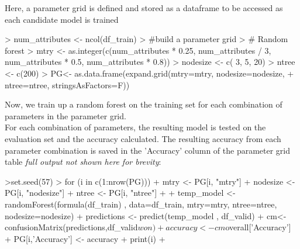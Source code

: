 \documentclass[10pt]{article}
\begin{document}
Here, a parameter grid is defined and stored as a dataframe to be accessed as each candidate model is trained
\begin{Schunk}
\begin{Sinput}
> num_attributes <- ncol(df_train)
> #build a parameter grid
> # Random forest
> mtry <- as.integer(c(num_attributes * 0.25, num_attributes / 3, num_attributes * 0.5, num_attributes * 0.8))
> nodesize <- c( 3, 5, 20)
> ntree <- c(200)
> PG<- as.data.frame(expand.grid(mtry=mtry, nodesize=nodesize,
+                                          ntree=ntree, stringsAsFactors=F))
\end{Sinput}
\end{Schunk}
Now, we train up a random forest on the training set for each combination of parameters in the parameter grid. \\
For each combination of parameters, the resulting model is tested on the evaluation set and the accuracy calculated.
The resulting accuracy from each parameter combination is saved in the 'Accuracy' column of the parameter grid table \textit{full output not shown here for brevity}:
\begin{Schunk}
\begin{Sinput}
>set.seed(57)
> for (i in c(1:nrow(PG))){
+   mtry <- PG[i, "mtry"]
+   nodesize <- PG[i, "nodesize"]
+   ntree <- PG[i, "ntree"]
+ 
+   temp_model <- randomForest(formula(df_train) , data=df_train, mtry=mtry, ntree=ntree, nodesize=nodesize)
+   predictions <- predict(temp_model , df_valid)
+   cm<- confusionMatrix(predictions,df_valid$won)
+   accuracy <- cm$overall['Accuracy']
+   PG[i,'Accuracy'] <- accuracy
+   print(i)
+ }
\end{Sinput}

\end{Schunk}
\end{document}
